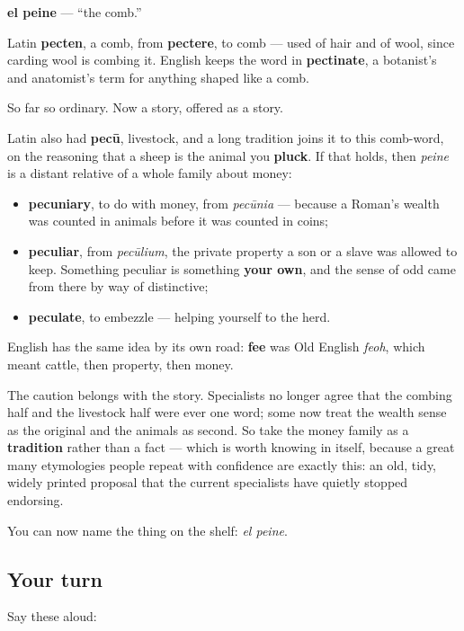 \begin{cousinweb}
\textbf{el peine} — \textquotedblleft{}the comb.\textquotedblright{}

Latin \textbf{pecten}, a comb, from \textbf{pectere}, to comb — used of hair and of wool, since carding wool is combing it. English keeps the word in \textbf{pectinate}, a botanist's and anatomist's term for anything shaped like a comb.

So far so ordinary. Now a story, offered as a story.

Latin also had \textbf{pecū}, livestock, and a long tradition joins it to this comb-word, on the reasoning that a sheep is the animal you \textbf{pluck}. If that holds, then \emph{peine} is a distant relative of a whole family about money:

\begin{itemize}
\raggedright
  \item \textbf{pecuniary}, to do with money, from \emph{pecūnia} — because a Roman's wealth was counted in animals before it was counted in coins;
  \item \textbf{peculiar}, from \emph{pecūlium}, the private property a son or a slave was allowed to keep. Something peculiar is something \textbf{your own}, and the sense of odd came from there by way of distinctive;
  \item \textbf{peculate}, to embezzle — helping yourself to the herd.
\end{itemize}

English has the same idea by its own road: \textbf{fee} was Old English \emph{feoh}, which meant cattle, then property, then money.

The caution belongs with the story. Specialists no longer agree that the combing half and the livestock half were ever one word; some now treat the wealth sense as the original and the animals as second. So take the money family as a \textbf{tradition} rather than a fact — which is worth knowing in itself, because a great many etymologies people repeat with confidence are exactly this: an old, tidy, widely printed proposal that the current specialists have quietly stopped endorsing.
\end{cousinweb}

\begin{grammarlens}[title={What you've built}]
You can now name the thing on the shelf: \emph{el peine}.
\end{grammarlens}

\subsection*{Your turn}
Say these aloud:

